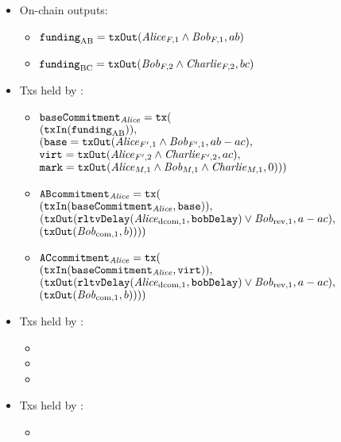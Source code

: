   \begin{itemize}
    \item On-chain outputs:
    \begin{itemize}
      \item $\mathtt{funding}_{\mathrm{AB}} = \mathtt{txOut}(\mathit{Alice}_{F, 1} \wedge
      \mathit{Bob}_{F, 1}, ab)$
      \item $\mathtt{funding}_{\mathrm{BC}} = \mathtt{txOut}(\mathit{Bob}_{F, 2} \wedge
      \mathit{Charlie}_{F, 2}, bc)$
    \end{itemize}
    \item Txs held by \alice:
    \begin{itemize}
      \item $\mathtt{baseCommitment}_{\mathit{Alice}} = \texttt{tx}($ \\
        $(\mathtt{txIn}(\mathtt{funding}_{\mathrm{AB}})),$ \\
        $(\mathtt{base} = \mathtt{txOut}(\mathit{Alice}_{F', 1} \wedge \mathit{Bob}_{F', 1}, ab - ac),$ \\
        $\mathtt{virt} = \mathtt{txOut}(\mathit{Alice}_{F', 2} \wedge \mathit{Charlie}_{F', 2}, ac),$ \\
        $\mathtt{mark} = \mathtt{txOut}(\mathit{Alice}_{M, 1} \wedge \mathit{Bob}_{M, 1} \wedge
        \mathit{Charlie}_{M, 1}, 0)))$
      \item $\mathtt{ABcommitment}_{\mathit{Alice}} = \texttt{tx}($ \\
        $(\mathtt{txIn}(\mathtt{baseCommitment}_{\mathit{Alice}}, \mathtt{base})),$  \\
        $(\mathtt{txOut}(\mathtt{rltvDelay}(\mathit{Alice}_{\mathrm{dcom}, 1}, \mathtt{bobDelay}) \vee
        \mathit{Bob}_{\mathrm{rev}, 1}, a - ac),$ \\
        $(\mathtt{txOut}(\mathit{Bob}_{\mathrm{com}, 1}, b))))$
      \item $\mathtt{ACcommitment}_{\mathit{Alice}} = \texttt{tx}($ \\
        $(\mathtt{txIn}(\mathtt{baseCommitment}_{\mathit{Alice}}, \mathtt{virt})),$ \\
        $(\mathtt{txOut}(\mathtt{rltvDelay}(\mathit{Alice}_{\mathrm{dcom}, 1}, \mathtt{bobDelay}) \vee
        \mathit{Bob}_{\mathrm{rev}, 1}, a - ac),$ \\
        $(\mathtt{txOut}(\mathit{Bob}_{\mathrm{com}, 1}, b))))$
    \end{itemize}
    \item Txs held by \bob:
    \begin{itemize}
      \item
      \item
      \item
    \end{itemize}
    \item Txs held by \charlie:
    \begin{itemize}
      \item
    \end{itemize}
  \end{itemize}
